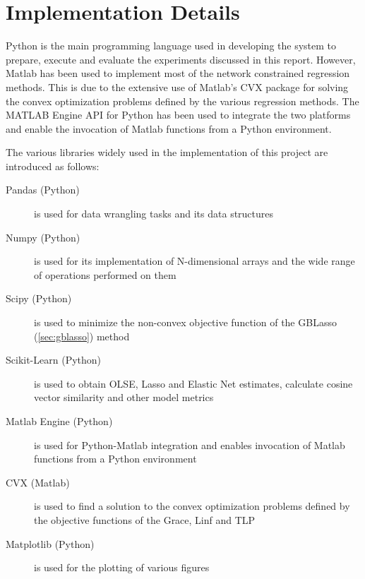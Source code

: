 \chapter{Implementation Details} \label{sec:implementation}
Python is the main programming language used in developing the system to prepare, execute and evaluate the experiments discussed in this report. However, Matlab has been used to implement most of the network constrained regression methods. This is due to the extensive use of Matlab's CVX package \cite{grant2014cvx}\cite{grant2008graph} for solving the convex optimization problems defined by the various regression methods. The MATLAB Engine API for Python has been used to integrate the two platforms and enable the invocation of Matlab functions from a Python environment.

The various libraries widely used in the implementation of this project are introduced as follows:
\begin{description}
	\item[Pandas (Python)] is used for data wrangling tasks and its data structures
	\item[Numpy (Python)] is used for its implementation of N-dimensional arrays and the wide range of operations performed on them
	\item[Scipy (Python)] is used to minimize the non-convex objective function of the GBLasso (\ref{sec:gblasso}) method
	\item[Scikit-Learn (Python)] is used to obtain OLSE, Lasso and Elastic Net estimates, calculate cosine vector similarity and other model metrics 
	\item[Matlab Engine (Python)] is used for Python-Matlab integration and enables invocation of Matlab functions from a Python environment
	\item[CVX (Matlab)] is used to find a solution to the convex optimization problems defined by the objective functions of the Grace, Linf and TLP
	\item[Matplotlib (Python)] is used for the plotting of various figures
\end{description}

